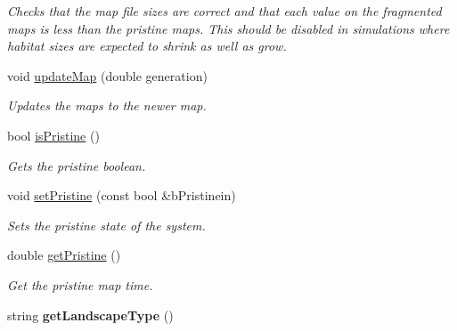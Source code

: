\begin{DoxyCompactItemize}
\begin{DoxyCompactList}\small\item\em Checks that the map file sizes are correct and that each value on the fragmented maps is less than the pristine maps. This should be disabled in simulations where habitat sizes are expected to shrink as well as grow. \end{DoxyCompactList}\item 
void \hyperlink{class_map_a0c71277515f9f2fc5e2ae586ae9d07f8}{update\+Map} (double generation)\hypertarget{class_map_a0c71277515f9f2fc5e2ae586ae9d07f8}{}\label{class_map_a0c71277515f9f2fc5e2ae586ae9d07f8}

\begin{DoxyCompactList}\small\item\em Updates the maps to the newer map. \end{DoxyCompactList}\item 
bool \hyperlink{class_map_a7c4ca1306850126bf6c040f1c0cc0754}{is\+Pristine} ()
\begin{DoxyCompactList}\small\item\em Gets the pristine boolean. \end{DoxyCompactList}\item 
void \hyperlink{class_map_aff6628e343532689d5bdcee2433ac041}{set\+Pristine} (const bool \&b\+Pristinein)
\begin{DoxyCompactList}\small\item\em Sets the pristine state of the system. \end{DoxyCompactList}\item 
double \hyperlink{class_map_a56f158adbe67d3eea95e2537493851f1}{get\+Pristine} ()
\begin{DoxyCompactList}\small\item\em Get the pristine map time. \end{DoxyCompactList}\item 
string {\bfseries get\+Landscape\+Type} ()\hypertarget{class_map_a89f96e39e9111c0c6a05a1ee59e7a5d5}{}\label{class_map_a89f96e39e9111c0c6a05a1ee59e7a5d5}


\end{DoxyCompactItemize}
